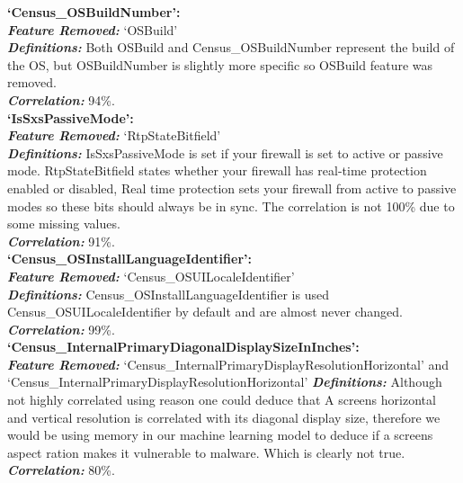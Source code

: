 \documentclass[sigconf]{acmart}
\begin{document}
\begin{center}
\textbf{`Census\_OSBuildNumber':}\\
    \textbf{\textit{Feature Removed: }}`OSBuild'\\
    \textbf{\textit{Definitions:}} Both OSBuild and Census\_OSBuildNumber represent the build of the OS, but OSBuildNumber is slightly more specific so OSBuild feature was removed.\\
    \textbf{\textit{Correlation: }}94\%.\\
    \vspace{5mm}
\textbf{`IsSxsPassiveMode':}\\
    \textbf{\textit{Feature Removed: }}`RtpStateBitfield'\\
    \textbf{\textit{Definitions:}} IsSxsPassiveMode is set if your firewall is set to active or passive mode. RtpStateBitfield states whether your firewall has real-time protection enabled or disabled, Real time protection sets your firewall from active to passive modes so these bits should always be in sync. The correlation is not 100\% due to some missing values.\\
    \textbf{\textit{Correlation: }}91\%.\\
    \vspace{5mm}
\textbf{`Census\_OSInstallLanguageIdentifier':}\\
    \textbf{\textit{Feature Removed: }}`Census\_OSUILocaleIdentifier'\\
    \textbf{\textit{Definitions:}} Census\_OSInstallLanguageIdentifier is used Census\_OSUILocaleIdentifier by default and are almost never changed. \\
    \textbf{\textit{Correlation: }}99\%.\\
    \vspace{5mm}
\textbf{`Census\_InternalPrimaryDiagonalDisplaySizeInInches':}\\
    \textbf{\textit{Feature Removed: }}`Census\_InternalPrimaryDisplayResolutionHorizontal' and \\
    `Census\_InternalPrimaryDisplayResolutionHorizontal'
    \textbf{\textit{Definitions:}} Although not highly correlated using reason one could deduce that A screens horizontal and vertical resolution is correlated with its diagonal display size, therefore we would be using memory in our machine learning model to deduce if a screens aspect ration makes it vulnerable to malware. Which is clearly not true.\\
    \textbf{\textit{Correlation: }}80\%.\\

\end{center}
\end{document}
